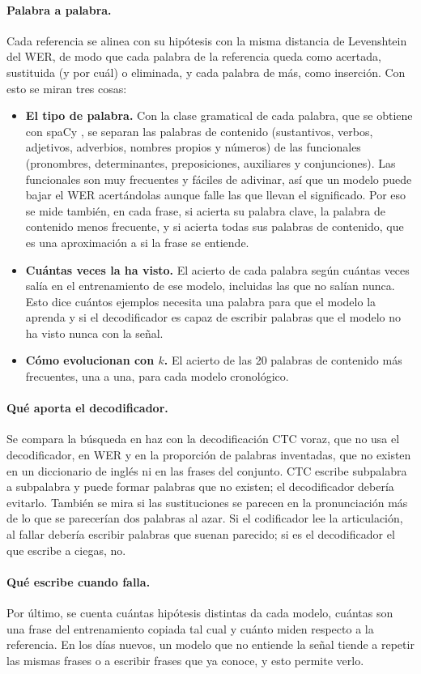 \paragraph{Palabra a palabra.} Cada referencia se alinea con su hipótesis con la misma distancia de Levenshtein del WER, de modo que cada palabra de la referencia queda como acertada, sustituida (y por cuál) o eliminada, y cada palabra de más, como inserción. Con esto se miran tres cosas:
\begin{itemize}[leftmargin=*, itemsep=0.3em]
  \item \textbf{El tipo de palabra.} Con la clase gramatical de cada palabra, que se obtiene con spaCy \cite{honnibal2020spacy}, se separan las palabras de contenido (sustantivos, verbos, adjetivos, adverbios, nombres propios y números) de las funcionales (pronombres, determinantes, preposiciones, auxiliares y conjunciones). Las funcionales son muy frecuentes y fáciles de adivinar, así que un modelo puede bajar el WER acertándolas aunque falle las que llevan el significado. Por eso se mide también, en cada frase, si acierta su palabra clave, la palabra de contenido menos frecuente, y si acierta todas sus palabras de contenido, que es una aproximación a si la frase se entiende.
  \item \textbf{Cuántas veces la ha visto.} El acierto de cada palabra según cuántas veces salía en el entrenamiento de ese modelo, incluidas las que no salían nunca. Esto dice cuántos ejemplos necesita una palabra para que el modelo la aprenda y si el decodificador es capaz de escribir palabras que el modelo no ha visto nunca con la señal.
  \item \textbf{Cómo evolucionan con $k$.} El acierto de las 20 palabras de contenido más frecuentes, una a una, para cada modelo cronológico.
\end{itemize}

\paragraph{Qué aporta el decodificador.} Se compara la búsqueda en haz con la decodificación CTC voraz, que no usa el decodificador, en WER y en la proporción de palabras inventadas, que no existen en un diccionario de inglés ni en las frases del conjunto. CTC escribe subpalabra a subpalabra y puede formar palabras que no existen; el decodificador debería evitarlo. También se mira si las sustituciones se parecen en la pronunciación más de lo que se parecerían dos palabras al azar. Si el codificador lee la articulación, al fallar debería escribir palabras que suenan parecido; si es el decodificador el que escribe a ciegas, no.

\paragraph{Qué escribe cuando falla.} Por último, se cuenta cuántas hipótesis distintas da cada modelo, cuántas son una frase del entrenamiento copiada tal cual y cuánto miden respecto a la referencia. En los días nuevos, un modelo que no entiende la señal tiende a repetir las mismas frases o a escribir frases que ya conoce, y esto permite verlo.

